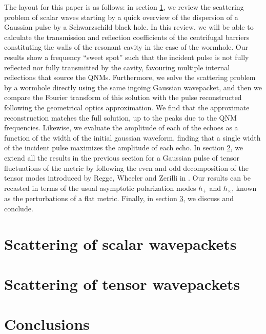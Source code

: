\documentclass[article,aps,nofootinbib,twocolumn,superscriptaddress]{revtex4-1}
\begin{document}
The layout for this paper is as follows: in section \ref{sec:scalar}, we review the scattering problem of scalar waves starting by a quick overview of the dispersion of a Gaussian pulse by a Schwarzschild black hole. In this review, we will be able to calculate the transmission and reflection coefficients of the centrifugal barriers constituting the walls of the resonant cavity in the case of the wormhole. Our results show a frequency ``sweet spot'' such that the incident pulse is not fully reflected nor fully transmitted by the cavity, favouring multiple internal reflections that source the QNMs.  Furthermore, we solve the scattering problem by a wormhole directly using the same ingoing Gaussian wavepacket, and then we compare the Fourier transform of this solution with the pulse reconstructed following the geometrical optics approximation. We find that the approximate reconstruction matches the full solution, up to the peaks due to the QNM frequencies. Likewise, we evaluate the amplitude of each of the echoes as a function of the width of the initial gaussian waveform, finding that a single width of the incident pulse maximizes the amplitude of each echo. In section \ref{sec:tensor}, we extend all the results in the previous section for a Gaussian pulse of tensor fluctuations of the metric by following the even and odd decomposition of the tensor modes introduced by Regge, Wheeler and Zerilli in \citep{Regge:1957td, PhysRevD.2.2141, PhysRevD.5.2419, PhysRevD.5.2439}. Our results can be recasted in terms of the usual asymptotic polarization modes $h_+$ and $h_{\times}$, known as the perturbations of a flat metric. Finally, in section \ref{sec:conclusions}, we discuss and conclude.

\section{Scattering of scalar wavepackets}\label{sec:scalar}
\section{Scattering of tensor wavepackets}\label{sec:tensor}
\section{Conclusions}\label{sec:conclusions}


\end{document}
